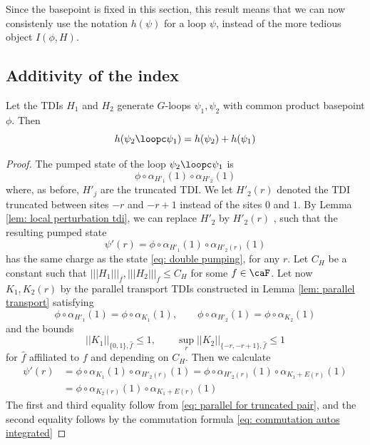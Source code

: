 Since the basepoint is fixed in this section, this result means that we can now consistenly use the notation $h(\psi)$ for a loop $\psi$, instead of the more tedious object $I(\phi,H)$. 


\subsection{Additivity of the index}

\begin{lemma} \label{lem: additivity}
	Let the TDIs $H_1$ and $H_2$ generate $G$-loops $\psi_1,\psi_2 $ with common product basepoint $\phi$.  Then
	$$
	h(\psi_2\loopc \psi_1)=h(\psi_2)+h(\psi_1)
	$$
\end{lemma}

\begin{proof}
	The pumped state of the loop $\psi_2\loopc \psi_1$ is 
	\begin{equation}  \label{eq: double pumping}
		\phi \circ \alpha_{H'_1}(1) \circ \alpha_{H'_2}(1)
	\end{equation}
	where, as before, $H'_{j}$ are the truncated TDI. We let  $H'_2(r)$ denoted the TDI truncated between sites $-r$ and $-r+1$ instead of the sites $0$ and $1$. By Lemma \ref{lem: local perturbation tdi}, we can replace $H'_2$ by $H'_2(r)$ , such that the resulting pumped state
	$$
	\psi'(r)=\phi \circ \alpha_{H'_1}(1) \circ \alpha_{H'_2(r)}(1)
	$$
	has the same charge as  the state \eqref{eq: double pumping}, for any $r$. 
	Let $C_H$ be a constant such that $|||H_1|||_f,|||H_2|||_f\leq C_H$ for some $f\in\caF$.
	Let now $K_1,K_2(r)$ by the parallel transport TDIs constructed in Lemma \ref{lem: parallel transport} satisfying
	\begin{equation}\label{eq: parallel for truncated pair}
		\phi \circ \alpha_{H'_1}(1)=\phi \circ \alpha_{K_1}(1) ,\qquad\phi \circ \alpha_{H'_2}(1)=\phi \circ \alpha_{K_2}(1)
	\end{equation}
	and the bounds 
	$$
	||K_1||_{\{0,1\}, \hat{f}} \leq  1,\qquad  \sup_r ||K_2||_{\{-r,-r+1\}, \hat{f}} \leq  1 
	$$
	for $\hat{f}$ affiliated to $f$ and depending on $C_H$.
	Then we calculate 
	\begin{align}
		\psi'(r) &= \phi \circ \alpha_{K_1}(1) \circ \alpha_{H'_2(r)}(1) 
		=\phi \circ \alpha_{H'_2(r)}(1) \circ \alpha_{K_1+E(r)}(1) \nonumber \\
		&=\phi \circ \alpha_{K_2(r)}(1) \circ \alpha_{K_1+E(r)}(1)\label{eq: double pumped repeat} 
	\end{align}
	The first and third equality follow from \eqref{eq: parallel for truncated pair}, and the second equality follows by the commutation formula \eqref{eq: commutation autos integrated}

\end{proof}
